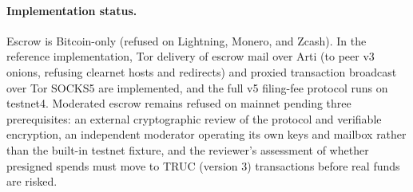 \paragraph{Implementation status.} Escrow is Bitcoin-only (refused on Lightning, Monero, and Zcash). In the reference implementation, Tor delivery of escrow mail over Arti (to peer v3 onions, refusing clearnet hosts and redirects) and proxied transaction broadcast over Tor SOCKS5 are implemented, and the full v5 filing-fee protocol runs on testnet4. Moderated escrow remains refused on mainnet pending three prerequisites: an external cryptographic review of the protocol and verifiable encryption, an independent moderator operating its own keys and mailbox rather than the built-in testnet fixture, and the reviewer's assessment of whether presigned spends must move to TRUC (version 3) transactions before real funds are risked.
